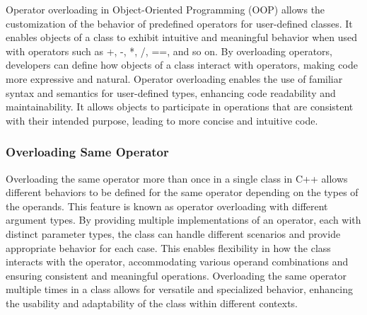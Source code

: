 Operator overloading in Object-Oriented Programming (OOP) allows the customization of the behavior of predefined operators for user-defined classes. It enables objects of a class to exhibit intuitive and meaningful behavior when used with operators such as +, -, *, /, ==, and so on. By overloading operators, 
developers can define how objects of a class interact with operators, making code more expressive and natural. Operator overloading enables the use of familiar syntax and semantics for user-defined types, enhancing code readability and maintainability. It allows objects to participate in operations that are 
consistent with their intended purpose, leading to more concise and intuitive code.

\subsubsection*{Overloading Same Operator}

Overloading the same operator more than once in a single class in C++ allows different behaviors to be defined for the same operator depending on the types of the operands. This feature is known as operator overloading with different argument types. By providing multiple implementations of an operator, each 
with distinct parameter types, the class can handle different scenarios and provide appropriate behavior for each case. This enables flexibility in how the class interacts with the operator, accommodating various operand combinations and ensuring consistent and meaningful operations. Overloading the same operator 
multiple times in a class allows for versatile and specialized behavior, enhancing the usability and adaptability of the class within different contexts.

